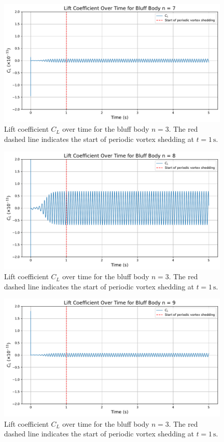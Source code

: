 \begin{figure}[H]
	\centering
	\includegraphics[width=\textwidth]{images/7face_graph}
	\caption{Lift coefficient $C_L$ over time for the bluff body $n=3$. The red dashed line indicates the start of periodic vortex shedding at $t = 1\,\mathrm{s}$.}
	\label{fig:7FaceGraph} 
\end{figure}

\begin{figure}[H]
	\centering
	\includegraphics[width=\textwidth]{images/8face_graph}
	\caption{Lift coefficient $C_L$ over time for the bluff body $n=3$. The red dashed line indicates the start of periodic vortex shedding at $t = 1\,\mathrm{s}$.}
	\label{fig:8FaceGraph} 
\end{figure}

\begin{figure}[H]
	\centering
	\includegraphics[width=\textwidth]{images/9face_graph}
	\caption{Lift coefficient $C_L$ over time for the bluff body $n=3$. The red dashed line indicates the start of periodic vortex shedding at $t = 1\,\mathrm{s}$.}
	\label{fig:9FaceGraph} 
\end{figure}

